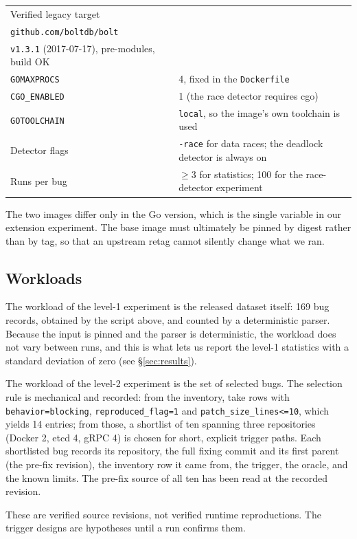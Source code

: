 \documentclass[11pt]{article}
\begin{document}
\begin{table}[h]
\begin{tabular}{@{}p{}p{}@{}}
Verified legacy target & \\\texttt{github.com/boltdb/bolt} \\\texttt{v1.3.1} (2017-07-17), pre-modules, build OK \\
\texttt{GOMAXPROCS} & 4, fixed in the \texttt{Dockerfile} \\
\texttt{CGO\_ENABLED} & 1 (the race detector requires cgo) \\
\texttt{GOTOOLCHAIN} & \texttt{local}, so the image's own toolchain is used \\
Detector flags & \texttt{-race} for data races; the deadlock detector is always on \\
Runs per bug & $\geq 3$ for statistics; 100 for the race-detector experiment \\
\bottomrule
\end{tabular}
\end{table}

The two images differ only in the Go version, which is the single variable in
our extension experiment. The base image must ultimately be pinned by digest
rather than by tag, so that an upstream retag cannot silently change what we
ran.

\subsection{Workloads}

The workload of the level-1 experiment is the released dataset itself: 169
bug records, obtained by the script above, and counted by a deterministic
parser. Because the input is pinned and the parser is deterministic, the
workload does not vary between runs, and this is what lets us report the
level-1 statistics with a standard deviation of zero (see
\S\ref{sec:results}).

The workload of the level-2 experiment is the set of selected bugs. The
selection rule is mechanical and recorded: from the inventory, take rows with
\texttt{behavior=blocking}, \texttt{reproduced\_flag=1} and
\texttt{patch\_size\_lines<=10}, which yields 14 entries; from those, a
shortlist of ten spanning three repositories (Docker 2, etcd 4, gRPC 4) is
chosen for short, explicit trigger paths. Each shortlisted bug records its
repository, the full fixing commit and its first parent (the pre-fix
revision), the inventory row it came from, the trigger, the oracle, and the
known limits. The pre-fix source of all ten has been read at the recorded
revision.

These are verified source revisions, not verified runtime reproductions. The
trigger designs are hypotheses until a run confirms them.
\end{document}
